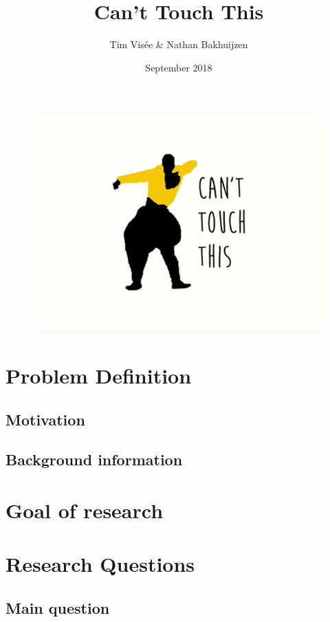 \documentclass[a4paper]{article}
\title{Can't Touch This}
\author{Tim Visée \& Nathan Bakhuijzen}
\date{September 2018}
\begin{document}
  \maketitle
  \begin{figure}[h]
    \centering
    \includegraphics[width=\linewidth]{cant-touch-this}
  \end{figure}

  \clearpage

  \section{Problem Definition}
  \subsection{Motivation}
  \subsection{Background information}
  \clearpage

  \section{Goal of research} %
  \clearpage

  \section{Research Questions}
  \subsection{Main question}
\end{document}
